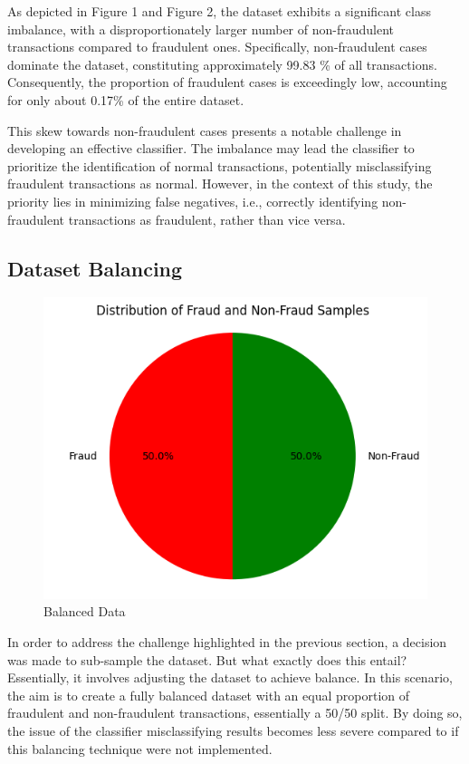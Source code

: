 \documentclass[conference]{IEEEtran}
\begin{document}
As depicted in Figure 1 and Figure 2, the dataset exhibits a significant class imbalance, with a disproportionately larger number of non-fraudulent transactions compared to fraudulent ones. Specifically, non-fraudulent cases dominate the dataset, constituting approximately 99.83 \% of all transactions. Consequently, the proportion of fraudulent cases is exceedingly low, accounting for only about 0.17\% of the entire dataset.

This skew towards non-fraudulent cases presents a notable challenge in developing an effective classifier. The imbalance may lead the classifier to prioritize the identification of normal transactions, potentially misclassifying fraudulent transactions as normal. However, in the context of this study, the priority lies in minimizing false negatives, i.e., correctly identifying non-fraudulent transactions as fraudulent, rather than vice versa.


\subsection{Dataset Balancing}\label{DB}

\begin{figure}[H]
    \centering
    \includegraphics[width=1\linewidth]{images/subsamplepie.png}
    \caption{Balanced Data}
    \label{fig:enter-label1}
\end{figure}

In order to address the challenge highlighted in the previous section, a decision was made to sub-sample the dataset. But what exactly does this entail? Essentially, it involves adjusting the dataset to achieve balance. In this scenario, the aim is to create a fully balanced dataset with an equal proportion of fraudulent and non-fraudulent transactions, essentially a 50/50 split. By doing so, the issue of the classifier misclassifying results becomes less severe compared to if this balancing technique were not implemented.
\end{document}
